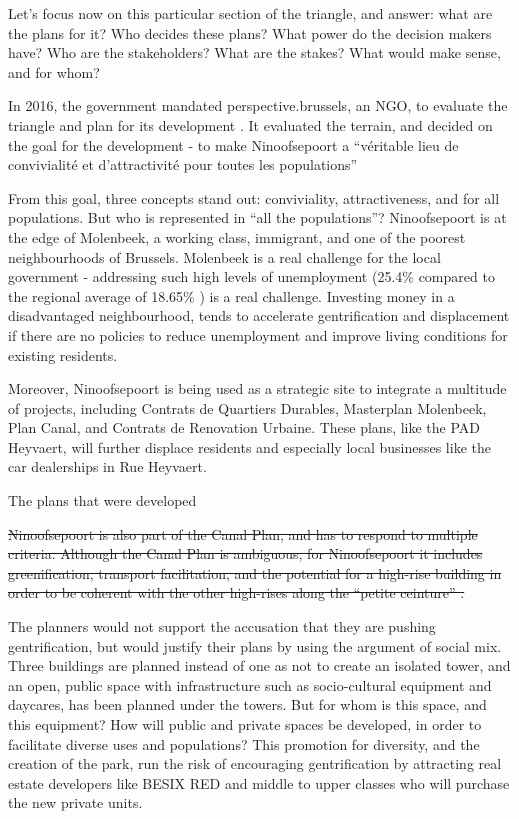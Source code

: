 \documentclass{article}[11pt]
\begin{document}
Let's focus now on this particular section of the triangle, and answer: what are the plans for it? Who decides these plans? What power do the decision makers have? Who are the stakeholders? What are the stakes? What would make sense, and for whom?

In 2016, the government mandated perspective.brussels, an NGO, to evaluate the triangle and plan for its development \parencite{diagnosticNinove}. It evaluated the terrain, and decided on the goal for the development - to make Ninoofsepoort a ``véritable lieu de convivialité et d’attractivité pour toutes les populations'' \parencite{perspectiveNinove}

From this goal, three concepts stand out: conviviality, attractiveness, and for all populations. But who is represented in ``all the populations''? Ninoofsepoort is at the edge of Molenbeek, a working class, immigrant, and one of the poorest neighbourhoods of Brussels. Molenbeek is a real challenge for the local government - addressing such high levels of unemployment (25.4\% compared to the regional average of 18.65\% \parencite{monitoring2018chomage}) is a real challenge. 
Investing money in a disadvantaged neighbourhood, tends to accelerate gentrification and displacement if there are no policies to reduce unemployment and improve living conditions for existing residents.

Moreover, Ninoofsepoort is being used as a strategic site to integrate a multitude of projects, including Contrats de Quartiers Durables, Masterplan Molenbeek, Plan Canal, and Contrats de Renovation Urbaine. These plans, like the PAD Heyvaert, will further displace residents and especially local businesses like the car dealerships in Rue Heyvaert. 

The plans that were developed 

\sout{Ninoofsepoort is also part of the Canal Plan, and has to respond to multiple criteria. Although the Canal Plan is ambiguous, for Ninoofsepoort it includes greenification, transport facilitation, and the potential for a high-rise building in order to be coherent with the other high-rises along the ``petite ceinture'' \parencite{diagnosticNinove}.}


The planners would not support the accusation that they are pushing gentrification, but would justify their plans by using the argument of social mix. Three buildings are planned instead of one as not to create an isolated tower, and an open, public space with infrastructure such as socio-cultural equipment and daycares, has been planned under the towers. But for whom is this space, and this equipment? How will public and private spaces be developed, in order to facilitate diverse uses and populations? This promotion for diversity, and the creation of the park, run the risk of encouraging gentrification by attracting real estate developers like BESIX RED and middle to upper classes who will purchase the new private units.
\end{document}
